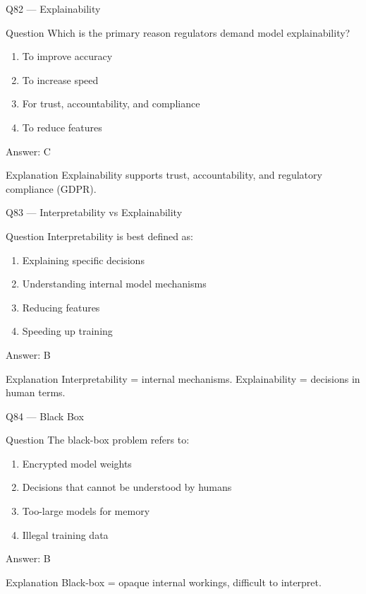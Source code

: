 \documentclass[aspectratio=169,8pt]{beamer}
\begin{document}
	\begin{frame}{Q82 --- Explainability}
		\begin{block}{Question}
			Which is the primary reason regulators demand model explainability?
		\end{block}
		\begin{enumerate}
			\item To improve accuracy
			\item To increase speed
			\item For trust, accountability, and compliance
			\item To reduce features
		\end{enumerate}
		\begin{exampleblock}{Answer: C}\end{exampleblock}
		\begin{block}{Explanation}
			Explainability supports trust, accountability, and regulatory compliance (GDPR).
		\end{block}
	\end{frame}
	
	\begin{frame}{Q83 --- Interpretability vs Explainability}
		\begin{block}{Question}
			Interpretability is best defined as:
		\end{block}
		\begin{enumerate}
			\item Explaining specific decisions
			\item Understanding internal model mechanisms
			\item Reducing features
			\item Speeding up training
		\end{enumerate}
		\begin{exampleblock}{Answer: B}\end{exampleblock}
		\begin{block}{Explanation}
			Interpretability = internal mechanisms. Explainability = decisions in human terms.
		\end{block}
	\end{frame}
	
	\begin{frame}{Q84 --- Black Box}
		\begin{block}{Question}
			The black-box problem refers to:
		\end{block}
		\begin{enumerate}
			\item Encrypted model weights
			\item Decisions that cannot be understood by humans
			\item Too-large models for memory
			\item Illegal training data
		\end{enumerate}
		\begin{exampleblock}{Answer: B}\end{exampleblock}
		\begin{block}{Explanation}
			Black-box = opaque internal workings, difficult to interpret.
		\end{block}
	\end{frame}
	
\end{document}
